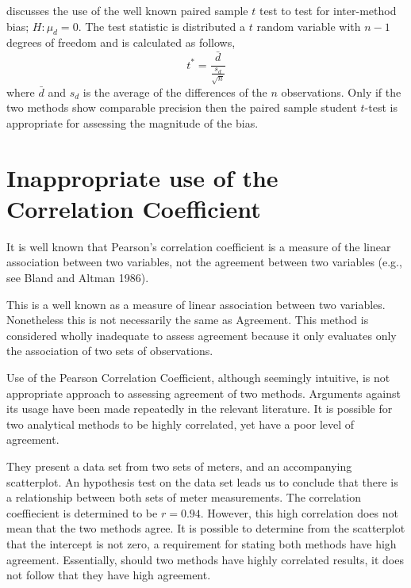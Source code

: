 \documentclass[12pt, a4paper]{report}
\theoremstyle{plain}
\theoremstyle{definition}
\theoremstyle{remark}
\begin{document}
\citet{Bartko} discusses the use of the well known paired sample $t$ test to test for inter-method bias; $H: \mu_{d}=0$. The test
statistic is distributed a $t$ random variable with $n-1$ degrees of freedom and is calculated as follows,
\begin{equation}
t^{*} = \frac{\bar{d}}{ \frac{s_{d}}{\sqrt{n}}}
\end{equation}
where $\bar{d}$ and $s_{d}$ is the average of the differences of the $n$ observations. Only if the two methods show comparable
precision then the paired sample student $t$-test is appropriate for assessing the magnitude of the bias.

			

			
	\section{Inappropriate use of the Correlation Coefficient}

It is well known that Pearson's correlation coefficient is a measure of the linear association between two variables, not the agreement between two variables (e.g., see Bland and Altman 1986).


This is a well known as a measure of linear association between two	variables. Nonetheless this is not necessarily the same as Agreement. This method is considered wholly inadequate to assess
		agreement because it only evaluates only the association of two sets of observations.
		
	Use of the Pearson
	 Correlation Coefficient, although seemingly intuitive, is not
	 appropriate approach to assessing agreement of two methods.
	 Arguments against its usage have been made repeatedly in the
	 relevant literature. It is possible for two analytical methods to
	 be highly correlated, yet have a poor level of agreement.
	 	

	
	They present a data set from two sets of meters, and an
	accompanying scatterplot. An hypothesis test on the data set leads
	us to conclude that there is a relationship between both sets of
	meter measurements. The correlation coeffiecient is determined to
	be $r =0.94 $. However, this high correlation does not mean that the
	two methods agree. It is possible to determine from the
	scatterplot that the intercept is not zero, a requirement for
	stating both methods have high agreement. Essentially, should two
	methods have highly correlated results, it does not follow that
	they have high agreement.
	
\end{document}
